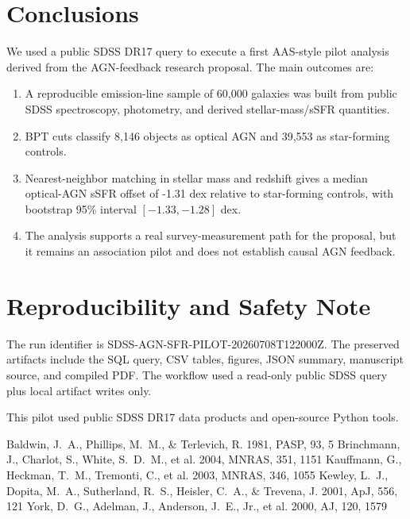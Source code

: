 \documentclass[twocolumn]{aastex631}
\begin{document}
\section{Conclusions}\label{sec:conclusions}
We used a public SDSS DR17 query to execute a first AAS-style pilot analysis derived from the AGN-feedback research proposal.  The main outcomes are:
\begin{enumerate}
\item A reproducible emission-line sample of 60,000 galaxies was built from public SDSS spectroscopy, photometry, and derived stellar-mass/sSFR quantities.
\item BPT cuts classify 8,146 objects as optical AGN and 39,553 as star-forming controls.
\item Nearest-neighbor matching in stellar mass and redshift gives a median optical-AGN sSFR offset of -1.31 dex relative to star-forming controls, with bootstrap 95\% interval $[-1.33,-1.28]$ dex.
\item The analysis supports a real survey-measurement path for the proposal, but it remains an association pilot and does not establish causal AGN feedback.
\end{enumerate}

\section*{Reproducibility and Safety Note}
The run identifier is SDSS-AGN-SFR-PILOT-20260708T122000Z.  The preserved artifacts include the SQL query, CSV tables, figures, JSON summary, manuscript source, and compiled PDF.  The workflow used a read-only public SDSS query plus local artifact writes only.

\acknowledgments
This pilot used public SDSS DR17 data products and open-source Python tools.

\begin{thebibliography}{}
 Baldwin, J.~A., Phillips, M.~M., \& Terlevich, R. 1981, PASP, 93, 5
 Brinchmann, J., Charlot, S., White, S.~D.~M., et al. 2004, MNRAS, 351, 1151
 Kauffmann, G., Heckman, T.~M., Tremonti, C., et al. 2003, MNRAS, 346, 1055
 Kewley, L.~J., Dopita, M.~A., Sutherland, R.~S., Heisler, C.~A., \& Trevena, J. 2001, ApJ, 556, 121
 York, D.~G., Adelman, J., Anderson, J.~E., Jr., et al. 2000, AJ, 120, 1579
\end{thebibliography}
\end{document}
